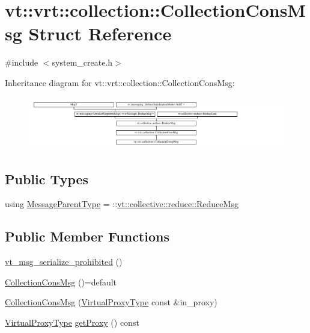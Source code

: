 \hypertarget{structvt_1_1vrt_1_1collection_1_1_collection_cons_msg}{}\section{vt\+:\+:vrt\+:\+:collection\+:\+:Collection\+Cons\+Msg Struct Reference}
\label{structvt_1_1vrt_1_1collection_1_1_collection_cons_msg}


{\ttfamily \#include $<$system\+\_\+create.\+h$>$}

Inheritance diagram for vt\+:\+:vrt\+:\+:collection\+:\+:Collection\+Cons\+Msg\+:\begin{figure}[H]
\begin{center}
\leavevmode
\includegraphics[height=2.304527cm]{structvt_1_1vrt_1_1collection_1_1_collection_cons_msg}
\end{center}
\end{figure}
\subsection*{Public Types}
\begin{DoxyCompactItemize}
\item 
using \hyperlink{structvt_1_1vrt_1_1collection_1_1_collection_cons_msg_a9738703ff8037982bd329a650c38a9a1}{Message\+Parent\+Type} = \+::\hyperlink{structvt_1_1collective_1_1reduce_1_1_reduce_msg}{vt\+::collective\+::reduce\+::\+Reduce\+Msg}
\end{DoxyCompactItemize}
\subsection*{Public Member Functions}
\begin{DoxyCompactItemize}
\item 
\hyperlink{structvt_1_1vrt_1_1collection_1_1_collection_cons_msg_a03c2ecf64adf5d122d672aad462568e8}{vt\+\_\+msg\+\_\+serialize\+\_\+prohibited} ()
\item 
\hyperlink{structvt_1_1vrt_1_1collection_1_1_collection_cons_msg_af0c627a9c74cb19c0aa142fa650ed4eb}{Collection\+Cons\+Msg} ()=default
\item 
\hyperlink{structvt_1_1vrt_1_1collection_1_1_collection_cons_msg_a86c701bab38600f7624466909a37925e}{Collection\+Cons\+Msg} (\hyperlink{namespacevt_a1b417dd5d684f045bb58a0ede70045ac}{Virtual\+Proxy\+Type} const \&in\+\_\+proxy)
\item 
\hyperlink{namespacevt_a1b417dd5d684f045bb58a0ede70045ac}{Virtual\+Proxy\+Type} \hyperlink{structvt_1_1vrt_1_1collection_1_1_collection_cons_msg_a53a70b2333e8bd56e4a8c72c76b35283}{get\+Proxy} () const
\end{DoxyCompactItemize}
